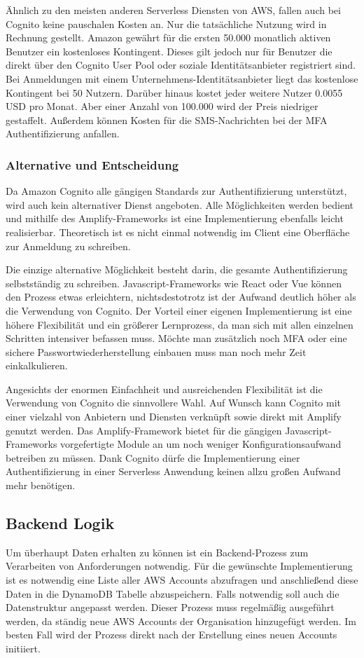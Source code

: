 {Ähnlich zu den meisten anderen Serverless Diensten von AWS, fallen auch bei Cognito keine pauschalen Kosten an.
Nur die tatsächliche Nutzung wird in Rechnung gestellt. Amazon gewährt für die ersten 50.000 monatlich aktiven Benutzer ein kostenloses Kontingent.
Dieses gilt jedoch nur für Benutzer die direkt über den Cognito User Pool oder soziale Identitätsanbieter registriert sind.
Bei Anmeldungen mit einem Unternehmens-Identitätsanbieter liegt das kostenlose Kontingent bei 50 Nutzern.
Darüber hinaus kostet jeder weitere Nutzer 0.0055 USD pro Monat. Aber einer Anzahl von 100.000 wird der Preis niedriger gestaffelt.
Außerdem können Kosten für die SMS-Nachrichten bei der MFA Authentifizierung anfallen.  \cite[]{CognitoPreise}


\subsubsection{Alternative und Entscheidung}

Da Amazon Cognito alle gängigen Standards zur Authentifizierung unterstützt, wird auch kein alternativer Dienst angeboten.
Alle Möglichkeiten werden bedient und mithilfe des Amplify-Frameworks ist eine Implementierung ebenfalls leicht realisierbar.
Theoretisch ist es nicht einmal notwendig im Client eine Oberfläche zur Anmeldung zu schreiben.

Die einzige alternative Möglichkeit besteht darin, die gesamte Authentifizierung selbstständig zu schreiben.
Javascript-Frameworks wie React oder Vue können den Prozess etwas erleichtern, nichtsdestotrotz ist der Aufwand deutlich höher als die Verwendung von Cognito.
Der Vorteil einer eigenen Implementierung ist eine höhere Flexibilität und ein größerer Lernprozess, da man sich mit allen einzelnen Schritten intensiver befassen muss.
Möchte man zusätzlich noch MFA oder eine sichere Passwortwiederherstellung einbauen muss man noch mehr Zeit einkalkulieren.

Angesichts der enormen Einfachheit und ausreichenden Flexibilität ist die Verwendung von Cognito die sinnvollere Wahl.
Auf Wunsch kann Cognito mit einer vielzahl von Anbietern und Diensten verknüpft sowie direkt mit Amplify genutzt werden.
Das Amplify-Framework bietet für die gängigen Javascript-Frameworks vorgefertigte Module an um noch weniger Konfigurationsaufwand betreiben zu müssen.
Dank Cognito dürfe die Implementierung einer Authentifizierung in einer Serverless Anwendung keinen allzu großen Aufwand mehr benötigen.


\subsection{Backend Logik}
Um überhaupt Daten erhalten zu können ist ein Backend-Prozess zum Verarbeiten von Anforderungen notwendig.
Für die gewünschte Implementierung ist es notwendig eine Liste aller AWS Accounts abzufragen und anschließend diese Daten in die DynamoDB Tabelle abzuspeichern. Falls notwendig soll auch die Datenstruktur angepasst werden.
Dieser Prozess muss regelmäßig ausgeführt werden, da ständig neue AWS Accounts der Organisation hinzugefügt werden.
Im besten Fall wird der Prozess direkt nach der Erstellung eines neuen Accounts initiiert.

}
